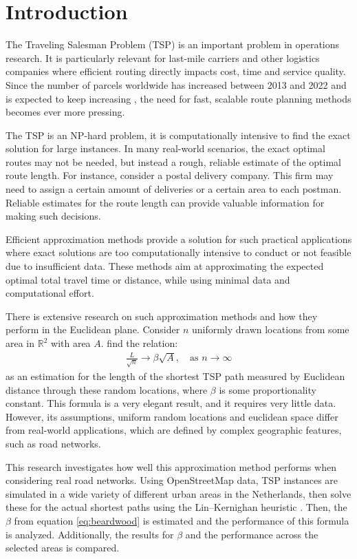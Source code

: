 \section{Introduction}
The Traveling Salesman Problem (TSP) is an important problem in operations research.
It is particularly relevant for last-mile carriers and other logistics companies where efficient
routing directly impacts cost, time and service quality. Since the number of parcels worldwide has
increased between 2013 and 2022 and is expected to keep increasing \citep{statista}, the need for
fast, scalable route planning methods becomes ever more pressing.

The TSP is an NP-hard problem, it is computationally intensive to find the exact solution for
large instances. In many real-world scenarios, the exact optimal routes may not be needed, but
instead a rough, reliable estimate of the optimal route length. For instance, consider a postal delivery company.
This firm may need to assign a certain amount of deliveries or a certain area to each postman.
Reliable estimates for the route length can provide valuable information for making such decisions.

Efficient approximation methods provide a solution for such practical applications where exact
solutions are too computationally intensive to conduct or not feasible due to insufficient data.
These methods aim at approximating the expected optimal total travel time or distance, while using
minimal data and computational effort.

There is extensive research on such approximation methods and how they perform in the Euclidean
plane.
Consider $n$ uniformly drawn locations from some area in $\mathbb{R}^2$ with area $A$.
\citet{beardwood1959shortest} find the relation:
\begin{align}
	\frac{L}{\sqrt n} \to \beta \sqrt{A}, \quad \text{as } n \to \infty
	\label{eq:beardwood}
\end{align}
as an estimation for the length of the shortest TSP path measured by Euclidean distance through
these random locations, where $\beta$ is some proportionality constant. This formula is a very
elegant result, and it requires very little data. However, its assumptions,
uniform random locations and euclidean space differ from real-world applications, which are defined
by complex geographic features, such as road networks.

This research investigates how well this approximation method performs when considering real road
networks. Using OpenStreetMap \citep{openstreetmap} data, TSP instances are simulated in a wide variety of different urban areas
in the Netherlands, then solve these for the actual shortest paths using the Lin–Kernighan heuristic
\citep{lin1973effective}.
Then, the $\beta$ from equation \ref{eq:beardwood} is estimated and the performance of this
formula is analyzed. Additionally, the results for $\beta$ and the performance across the selected
areas is compared.

